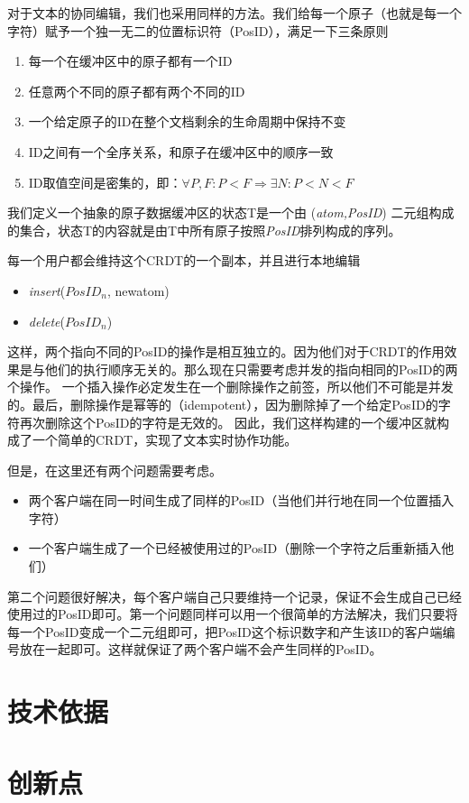 \documentclass[11pt]{ctexart}
\begin{document}
对于文本的协同编辑，我们也采用同样的方法。我们给每一个原子（也就是每一个字符）赋予一个独一无二的位置标识符（PosID），满足一下三条原则
\begin{enumerate}
	\item 每一个在缓冲区中的原子都有一个ID
	\item 任意两个不同的原子都有两个不同的ID
	\item 一个给定原子的ID在整个文档剩余的生命周期中保持不变
	\item ID之间有一个全序关系，和原子在缓冲区中的顺序一致
	\item ID取值空间是密集的，即：$\forall P, F : P < F \Rightarrow \exists N: P < N < F$
\end{enumerate}
我们定义一个抽象的原子数据缓冲区的状态T是一个由 (\textit{atom,PosID}) 二元组构成的集合，状态T的内容就是由T中所有原子按照\textit{PosID}排列构成的序列。 

每一个用户都会维持这个CRDT的一个副本，并且进行本地编辑
\begin{itemize}
	\item \textit{insert}($\mathit{PosID_{n}}$, newatom)
	\item \textit{delete}($\mathit{PosID_{n}}$)
\end{itemize}
这样，两个指向不同的PosID的操作是相互独立的。因为他们对于CRDT的作用效果是与他们的执行顺序无关的。那么现在只需要考虑并发的指向相同的PosID的两个操作。
一个插入操作必定发生在一个删除操作之前签，所以他们不可能是并发的。最后，删除操作是幂等的（idempotent），因为删除掉了一个给定PosID的字符再次删除这个PosID的字符是无效的。
因此，我们这样构建的一个缓冲区就构成了一个简单的CRDT，实现了文本实时协作功能。

但是，在这里还有两个问题需要考虑。
\begin{itemize}
	\item 两个客户端在同一时间生成了同样的PosID（当他们并行地在同一个位置插入字符）
	\item 一个客户端生成了一个已经被使用过的PosID（删除一个字符之后重新插入他们）
\end{itemize}

第二个问题很好解决，每个客户端自己只要维持一个记录，保证不会生成自己已经使用过的PosID即可。第一个问题同样可以用一个很简单的方法解决，我们只要将每一个PosID变成一个二元组即可，把PosID这个标识数字和产生该ID的客户端编号放在一起即可。这样就保证了两个客户端不会产生同样的PosID。

\section{技术依据}
\section{创新点}

\nocite{*}


\end{document}
